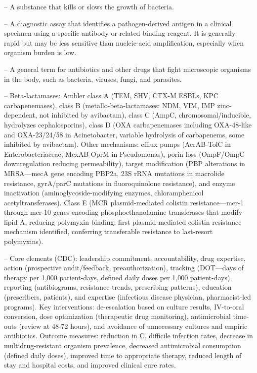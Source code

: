 -- A substance that kills or slows the growth of bacteria.

-- A diagnostic assay that identifies a pathogen-derived antigen in a clinical specimen using a specific antibody or related binding reagent. It is generally rapid but may be less sensitive than nucleic-acid amplification, especially when organism burden is low.

-- A general term for antibiotics and other drugs that fight microscopic organisms in the body, such as bacteria, viruses, fungi, and parasites.

-- Beta-lactamases: Ambler class A (TEM, SHV, CTX-M ESBLs, KPC carbapenemases), class B (metallo-beta-lactamases: NDM, VIM, IMP zinc-dependent, not inhibited by avibactam), class C (AmpC, chromosomal/inducible, hydrolyzes cephalosporins), class D (OXA carbapenemases including OXA-48-like and OXA-23/24/58 in Acinetobacter, variable hydrolysis of carbapenems, some inhibited by avibactam). Other mechanisms: efflux pumps (AcrAB-TolC in Enterobacteriaceae, MexAB-OprM in Pseudomonas), porin loss (OmpF/OmpC downregulation reducing permeability), target modification (PBP alterations in MRSA---mecA gene encoding PBP2a, 23S rRNA mutations in macrolide resistance, gyrA/parC mutations in fluoroquinolone resistance), and enzyme inactivation (aminoglycoside-modifying enzymes, chloramphenicol acetyltransferases). Class E (MCR plasmid-mediated colistin resistance---mcr-1 through mcr-10 genes encoding phosphoethanolamine transferases that modify lipid A, reducing polymyxin binding; first plasmid-mediated colistin resistance mechanism identified, conferring transferable resistance to last-resort polymyxins).

-- Core elements (CDC): leadership commitment, accountability, drug expertise, action (prospective audit/feedback, preauthorization), tracking (DOT---days of therapy per 1,000 patient-days, defined daily doses per 1,000 patient-days), reporting (antibiograms, resistance trends, prescribing patterns), education (prescribers, patients), and expertise (infectious disease physician, pharmacist-led programs). Key interventions: de-escalation based on culture results, IV-to-oral conversion, dose optimization (therapeutic drug monitoring), antimicrobial time-outs (review at 48-72 hours), and avoidance of unnecessary cultures and empiric antibiotics. Outcome measures: reduction in C. difficile infection rates, decrease in multidrug-resistant organism prevalence, decreased antimicrobial consumption (defined daily doses), improved time to appropriate therapy, reduced length of stay and hospital costs, and improved clinical cure rates.

